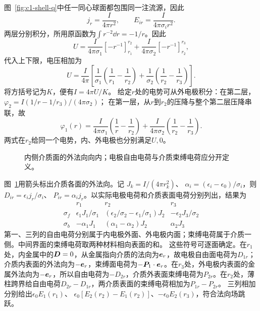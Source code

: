 \begin{solution}
图~\ref{fig:c1-shell-q}中任一同心球面都包围同一注流源，因此
\[
 j_r=\frac I{4\pi r^2},\qquad
 E_{ir}=\frac I{4\pi\sigma_i r^2}.
\]
两层分别积分，所用原函数为$\int r^{-2}\dd r=-1/r$。因此
\[
 U=\frac I{4\pi\sigma_1}[-r^{-1}]_{r_1}^{r_2}
 +\frac I{4\pi\sigma_2}[-r^{-1}]_{r_2}^{r_3},
\]
代入上下限，电压相加为
\[
 U=\frac I{4\pi}\left[
 \frac1{\sigma_1}\left(\frac1{r_1}-\frac1{r_2}\right)
 +\frac1{\sigma_2}\left(\frac1{r_2}-\frac1{r_3}\right)\right].
\]
将方括号记为$K$，便有$\boxed{I=4\pi U/K}$。
给定$r$处的电势可从外电极积分：在第二层，
$\varphi_2=I(1/r-1/r_3)/(4\pi\sigma_2)$；
在第一层，从$r$到$r_2$的压降与整个第二层压降串联，故
\[
 \varphi_1(r)=\frac I{4\pi\sigma_1}
 \left(\frac1r-\frac1{r_2}\right)
 +\frac I{4\pi\sigma_2}
 \left(\frac1{r_2}-\frac1{r_3}\right).
\]
两式在$r_2$给同一个电势，内、外电极也分别满足$U,0$。

\begin{figure}[H]\centering
{}
\caption{内侧介质面的外法向向内；电极自由电荷与介质束缚电荷应分开定义。}\label{fig:c1-shell-s}
\end{figure}

图~\ref{fig:c1-shell-s}用箭头标出介质各面的外法向。记
$J_k=I/(4\pi r_k^2)$、
$\alpha_i=(\epsilon_i-\epsilon_0)/\sigma_i$，则$D_{ir}=\epsilon_i j_r/\sigma_i$、
$P_{ir}=\alpha_i j_r$。以实际电极电荷和介质表面电荷分别列出，结果为
\[
 \begin{array}{c|ccc}
 &r_1&r_2&r_3\\ \hline
 \sigma_f&
 \epsilon_1J_1/\sigma_1&
 (\epsilon_2/\sigma_2-\epsilon_1/\sigma_1)J_2&
 -\epsilon_2J_3/\sigma_2\\
 \sigma_b&
 -\alpha_1J_1&
 (\alpha_1-\alpha_2)J_2&
 \alpha_2J_3
 \end{array}
\]
第一、三列的自由电荷分别属于内电极外面、外电极内面；束缚电荷属于介质一侧。中间界面的束缚电荷取两种材料相向表面的和。
这些符号可逐面确定。在$r_1$处，内金属中的$\bm{D}=0$，从金属指向介质的法向为$\bm{e}_r$，故电极自由面电荷为$D_{1r}$；介质内表面的外法向为$-\bm{e}_r$，束缚面电荷为$-\bm{P}_1\cdot\bm{e}_r$。在$r_3$处，外电极内表面的金属外法向为$-\bm{e}_r$，所以自由电荷为$-D_{2r}$，介质外表面束缚电荷为$P_{2r}$。在$r_2$处，薄柱跨界给自由电荷$D_{2r}-D_{1r}$，两介质表面的束缚电荷相加为$P_{1r}-P_{2r}$。
三列相加分别给出$\epsilon_0E_1(r_1)$、
$\epsilon_0[E_2(r_2)-E_1(r_2)]$、$-\epsilon_0E_2(r_3)$，符合法向场跳跃。


\end{solution}
